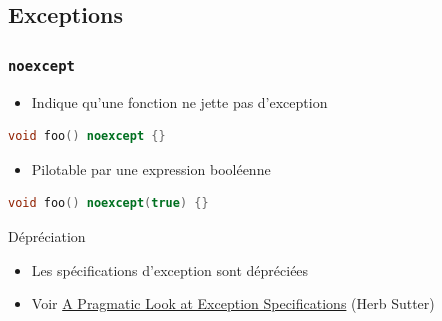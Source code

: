 \documentclass[C++.tex]{subfiles}
\begin{document}
\subsection*{Exceptions}
\begin{frame}[fragile]
	\frametitle{\lstinline|noexcept|}
	\begin{itemize}
		\item Indique qu'une fonction ne jette pas d'exception

	\end{itemize}

	\begin{lstlisting}[language=C++]
void foo() noexcept {}\end{lstlisting}

	\begin{itemize}
		\item Pilotable par une expression booléenne
	\end{itemize}

	\begin{lstlisting}[language=C++]
void foo() noexcept(true) {}\end{lstlisting}

	\begin{block}{Dépréciation}
		\begin{itemize}
			\item Les spécifications d'exception sont dépréciées
			\item Voir \href{http://www.gotw.ca/publications/mill22.htm}{A Pragmatic Look at Exception Specifications} (Herb Sutter)
		\end{itemize}

	\end{block}
\end{frame}
\end{document}
